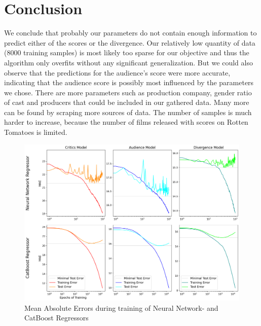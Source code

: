 \documentclass{article}
\begin{document}
    \section{Conclusion}
    We conclude that probably our parameters do not contain enough information to predict either of the scores or the divergence. Our relatively low quantity of data (8000 training samples) is most likely too sparse for our objective and thus the algorithm only overfits without any significant generalization. But we could also observe that the predictions for the audience's score were more accurate, indicating that the audience score is possibly most influenced by the parameters we chose. There are more parameters such as production company, gender ratio of cast and producers that could be included in our gathered data. Many more can be found by scraping more sources of data. The number of samples is much harder to increase, because the number of films released with scores on Rotten Tomatoes is limited.
    \begin{figure}[tb]
        \centering
        \includegraphics[width=1\textwidth]{imgs/regression_errors.png}
        \caption{Mean Absolute Errors during training of Neural Network- and CatBoost Regressors}
        \label{fig:mae_errors}
    \end{figure}

\clearpage


\end{document}

